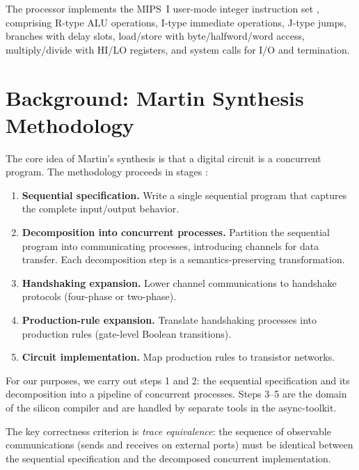 \documentclass[11pt]{article}
\begin{document}
The processor implements the MIPS~I user-mode integer instruction set
\cite{MIPSR3000}, comprising R-type ALU operations, I-type immediate
operations, J-type jumps, branches with delay slots, load/store with
byte/halfword/word access, multiply/divide with HI/LO registers, and system
calls for I/O and termination.

\section{Background: Martin Synthesis Methodology}

The core idea of Martin's synthesis is that a digital circuit is a concurrent
program.  The methodology proceeds in stages
\cite{Martin1990,Martin2006,MartinSynthesis}:

\begin{enumerate}
\item \textbf{Sequential specification.}  Write a single sequential program
  that captures the complete input/output behavior.

\item \textbf{Decomposition into concurrent processes.}  Partition the
  sequential program into communicating processes, introducing channels for
  data transfer.  Each decomposition step is a semantics-preserving
  transformation.

\item \textbf{Handshaking expansion.}  Lower channel communications to
  handshake protocols (four-phase or two-phase).

\item \textbf{Production-rule expansion.}  Translate handshaking processes into
  production rules (gate-level Boolean transitions).

\item \textbf{Circuit implementation.}  Map production rules to transistor
  networks.
\end{enumerate}

For our purposes, we carry out steps 1 and 2: the sequential specification and
its decomposition into a pipeline of concurrent processes.  Steps 3--5 are the
domain of the silicon compiler and are handled by separate tools in the
async-toolkit.

The key correctness criterion is \emph{trace equivalence}: the sequence of
observable communications (sends and receives on external ports) must be
identical between the sequential specification and the decomposed concurrent
implementation.
\end{document}
